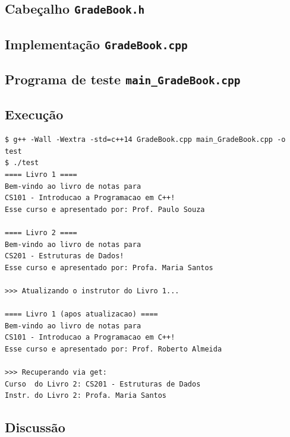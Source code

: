 \documentclass[11pt,a4paper]{article}
\begin{document}
\subsection*{Cabe\c{c}alho \texttt{GradeBook.h}}



\subsection*{Implementa\c{c}\~ao \texttt{GradeBook.cpp}}



\subsection*{Programa de teste \texttt{main\_GradeBook.cpp}}



\subsection*{Execu\c{c}\~ao}

\begin{saidabox}
\begin{lstlisting}[style=terminal]
$ g++ -Wall -Wextra -std=c++14 GradeBook.cpp main_GradeBook.cpp -o test
$ ./test
==== Livro 1 ====
Bem-vindo ao livro de notas para
CS101 - Introducao a Programacao em C++!
Esse curso e apresentado por: Prof. Paulo Souza

==== Livro 2 ====
Bem-vindo ao livro de notas para
CS201 - Estruturas de Dados!
Esse curso e apresentado por: Profa. Maria Santos

>>> Atualizando o instrutor do Livro 1...

==== Livro 1 (apos atualizacao) ====
Bem-vindo ao livro de notas para
CS101 - Introducao a Programacao em C++!
Esse curso e apresentado por: Prof. Roberto Almeida

>>> Recuperando via get:
Curso  do Livro 2: CS201 - Estruturas de Dados
Instr. do Livro 2: Profa. Maria Santos
\end{lstlisting}
\end{saidabox}

\subsection*{Discuss\~ao}
\end{document}
